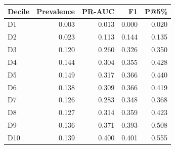 \begin{tabular}{@{}lrrrr@{}}
\toprule
Decile & Prevalence & PR-AUC & F1 & P@5\% \\
\midrule
D1 & 0.003 & 0.013 & 0.000 & 0.020 \\
D2 & 0.023 & 0.113 & 0.144 & 0.135 \\
D3 & 0.120 & 0.260 & 0.326 & 0.350 \\
D4 & 0.144 & 0.304 & 0.355 & 0.428 \\
D5 & 0.149 & 0.317 & 0.366 & 0.440 \\
D6 & 0.138 & 0.309 & 0.366 & 0.419 \\
D7 & 0.126 & 0.283 & 0.348 & 0.368 \\
D8 & 0.127 & 0.314 & 0.359 & 0.423 \\
D9 & 0.136 & 0.371 & 0.393 & 0.508 \\
D10 & 0.139 & 0.400 & 0.401 & 0.555 \\
\bottomrule
\end{tabular}
